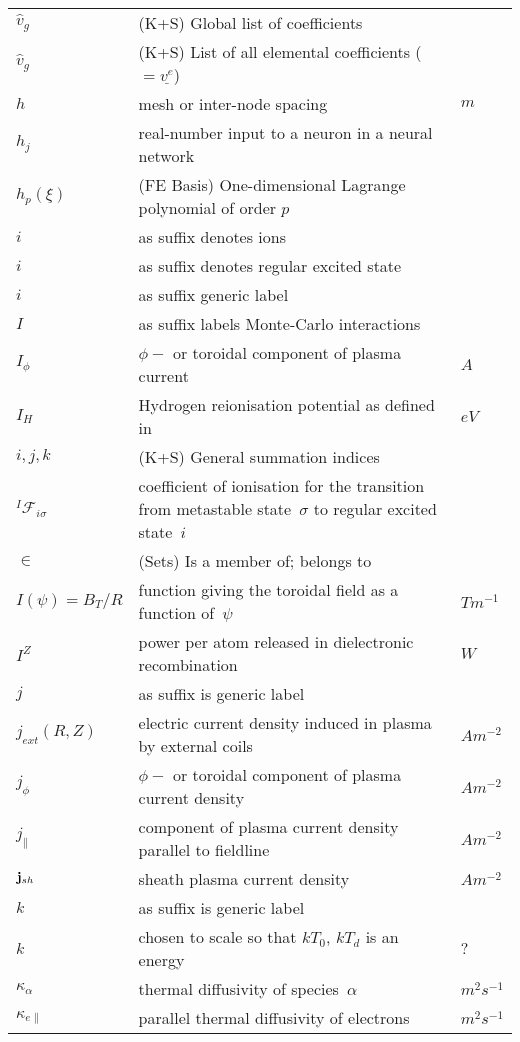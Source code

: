 \begin{longtable}{|p{3.0cm}|p{10.0cm}|p{3.0cm}|}
$\hat{v}_g$ &  (K+S) Global list of coefficients & \\
$\hat{v}_g$ &  (K+S) List of all elemental coefficients ($=\underline{v^e}$) & \\
$h$ & mesh or inter-node spacing & $m$ \\
$h_j$ & real-number input to a neuron in a neural network  & \\
$h_p(\xi)$ &  (FE Basis) One-dimensional Lagrange polynomial of order $p$ & \\
$i$ & as suffix denotes ions & \\
$i$ & as suffix denotes regular excited state & \\
$i$ & as suffix generic label & \\
$I$ & as suffix labels Monte-Carlo interactions & \\
$I_\phi$ & $\phi-$ or toroidal component of plasma current & $A$ \\
$I_H$ & Hydrogen reionisation potential as defined in~\cite{Ha13Benc} & $eV$ \\
$i,j,k$ &  (K+S) General summation indices & \\
$^I\mathcal{F}_{i\sigma}$ & coefficient of ionisation for the transition from metastable state~$\sigma$ to regular excited state~$i$ & \\
$\in$ &  (Sets) Is a member of; belongs to & \\
$I(\psi)=B_T/R$ & function giving the toroidal field as a function of~$\psi$  & $T m^{-1}$ \\
$I^Z$ & power per atom released in dielectronic recombination  & $W$ \\
$j$ & as suffix is generic label & \\
$j_{ext}(R,Z)$ & electric current density induced in plasma by external coils  & $A m^{-2}$ \\
$j_\phi$ & $\phi-$ or toroidal component of plasma current density  & $A m^{-2}$ \\
$j_{\|}$ &  component of plasma current density parallel to fieldline & $A m^{-2}$ \\
${\bf j}_{sh}$ & sheath plasma current density  & $A m^{-2}$ \\
$k$ & as suffix is generic label & \\
$k$ & chosen to scale so that $kT_0$, $kT_d$ is an energy & $?$ \\
$\kappa_\alpha$ & thermal diffusivity of species~$\alpha$ & $m^2 s^{-1}$ \\
$\kappa_{e\|}$ & parallel thermal diffusivity of electrons & $m^2 s^{-1}$ \\

\end{longtable}
